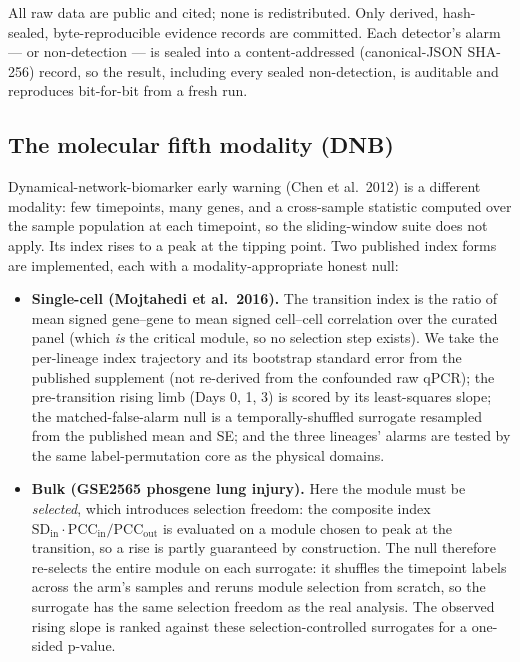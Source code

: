 \documentclass[aip,cha,preprint,amsmath,amssymb]{revtex4-2}
\begin{document}
All raw data are public and cited; none is redistributed. Only derived,
hash-sealed, byte-reproducible evidence records are committed. Each
detector's alarm --- or non-detection --- is sealed into a
content-addressed (canonical-JSON SHA-256) record, so the result,
including every sealed non-detection, is auditable and reproduces
bit-for-bit from a fresh run.

\subsection{The molecular fifth modality (DNB)}

Dynamical-network-biomarker early warning (Chen et al.\ 2012) is a
different modality: few timepoints, many genes, and a cross-sample
statistic computed over the sample population at each timepoint, so the
sliding-window suite does not apply. Its index rises to a peak at the
tipping point. Two published index forms are implemented, each with a
modality-appropriate honest null:

\begin{itemize}
  \item \textbf{Single-cell (Mojtahedi et al.\ 2016).} The transition
    index is the ratio of mean signed gene--gene to mean signed
    cell--cell correlation over the curated panel (which \emph{is} the
    critical module, so no selection step exists). We take the
    per-lineage index trajectory and its bootstrap standard error from
    the published supplement (not re-derived from the confounded raw
    qPCR); the pre-transition rising limb (Days 0, 1, 3) is scored by
    its least-squares slope; the matched-false-alarm null is a
    temporally-shuffled surrogate resampled from the published mean and
    SE; and the three lineages' alarms are tested by the same
    label-permutation core as the physical domains.
  \item \textbf{Bulk (GSE2565 phosgene lung injury).} Here the module
    must be \emph{selected}, which introduces selection freedom: the
    composite index
    $\mathrm{SD_{in}} \cdot \mathrm{PCC_{in}} / \mathrm{PCC_{out}}$ is
    evaluated on a module chosen to peak at the transition, so a rise
    is partly guaranteed by construction. The null therefore re-selects
    the entire module on each surrogate: it shuffles the timepoint
    labels across the arm's samples and reruns module selection from
    scratch, so the surrogate has the same selection freedom as the
    real analysis. The observed rising slope is ranked against these
    selection-controlled surrogates for a one-sided p-value.
\end{itemize}
\end{document}
